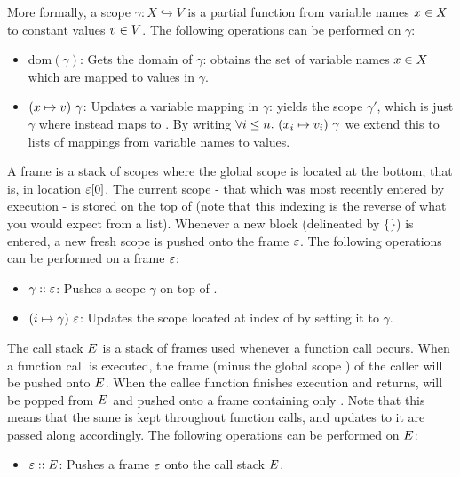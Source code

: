\documentclass[UTF8]{article}
\begin{document}
More formally, a scope $\gamma : X \hookrightarrow V$ is a partial function from variable names $x{} \in X$ to constant values $v{} \in V$. The following operations can be performed on $\gamma$:
\begin{itemize}
\item $\mathrm{dom} ( \gamma )$: Gets the domain of $\gamma$: obtains the set of variable names $x{} \in X$ which are mapped to values in $\gamma$.
\item $(x \mapsto  v) \,\, \gamma$: Updates a variable mapping in $\gamma$: yields the scope $\gamma'$, which is just $\gamma$ where \vn{} instead maps to \cval{}. By writing $\forall i \leq n. \,\, ({x}_i \mapsto  {\ensuremath{v}}_i) \,\, \gamma$ we extend this to lists of mappings from variable names to values.
\end{itemize}

A frame \currsf{} is a stack of scopes where the global scope \gscope{} is located at the bottom; that is, in location $\varepsilon [0]$. The current scope - that which was most recently entered by execution - is stored on the top of \currsf{}  (note that this indexing is the reverse of what you would expect from a list). Whenever a new block (delineated by $\{ \}$) is entered, a new fresh scope \escope{} is pushed onto the frame $\varepsilon$. %
The following operations can be performed on a frame $\varepsilon$:
\begin{itemize}
\item $ \gamma :: \varepsilon$: Pushes a scope $\gamma$ on top of \currsf{}.
\item $(i \mapsto  \gamma) \,\, \varepsilon$: Updates the scope located at index \num{} of \currsf{} by setting it to $\gamma$.
\end{itemize}

The call stack $E$ is a stack of frames used whenever a function call occurs. When a function call is executed, the frame \currsf{} (minus the global scope \gscope{}) of the caller will be pushed onto $E$. When the callee function finishes execution and returns, \currsf{} will be popped from $E$ and pushed onto a frame containing only \gscope{}. Note that this means that the same \gscope{} is kept throughout function calls, and updates to it are passed along accordingly. The following operations can be performed on $E$: 
\begin{itemize}
\item $ \varepsilon :: E$: Pushes a frame $\varepsilon$ onto the call stack $E$.
\end{itemize}
\end{document}
